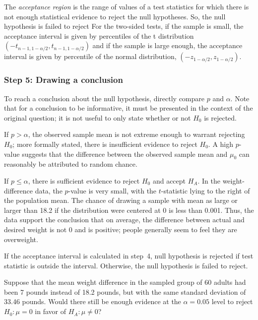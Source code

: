   The \emph{acceptance region} is the range of values of a test
  statistics for which there is not enough statistical evidence to
  reject the null hypotheses. So, the null hypothesis is failed to reject  For the two-sided tests, if the sample is small, the acceptance interval is given by percentiles of the t distribution $(-t_{n-1,1-\alpha/2}, t_{n-1,1-\alpha/2})$ and if the sample is large enough, the acceptance interval is given by percentile of the normal distribution, $(-z_{1-\alpha/2}, z_{1-\alpha/2})$. 


\subsubsection{Step 5: Drawing a conclusion}

To reach a conclusion about the null hypothesis, directly compare $p$ and $\alpha$. Note that for a conclusion to be informative, it must be presented in the context of the original question; it is not useful to only state whether or not $H_0$ is rejected.

If $p > \alpha$, the observed sample mean is not extreme enough to warrant rejecting $H_0$; more formally stated, there is insufficient evidence to reject $H_0$. A high $p$-value suggests that the difference between the observed sample mean and $\mu_0$ can reasonably be attributed to random chance.

If $p \leq \alpha$, there is sufficient evidence to reject $H_0$ and accept $H_A$. In the  weight-difference data, the $p$-value is very small, with the $t$-statistic lying to the right of the population mean. The chance of drawing a sample with mean as large or larger than 18.2 if the distribution were centered at 0 is less than 0.001. Thus, the data support the conclusion that on average, the difference between actual and desired weight is  not 0 and is positive; people generally seem to feel they are overweight.

If the acceptance interval is calculated in step~4, null hypothesis is rejected if test statistic is outside the interval. Otherwise, the null hypothesis is failed to reject.   

\begin{exercisewrap}
\begin{nexercise}
Suppose that the mean weight difference in the sampled group of 60 adults had been 7 pounds instead of 18.2 pounds, but with the same standard deviation of 33.46 pounds. Would there still be enough evidence at the $\alpha = 0.05$ level to reject $H_0: \mu = 0$ in favor of $H_A: \mu \neq 0$?\footnotemark{}
\end{nexercise}
\end{exercisewrap}


